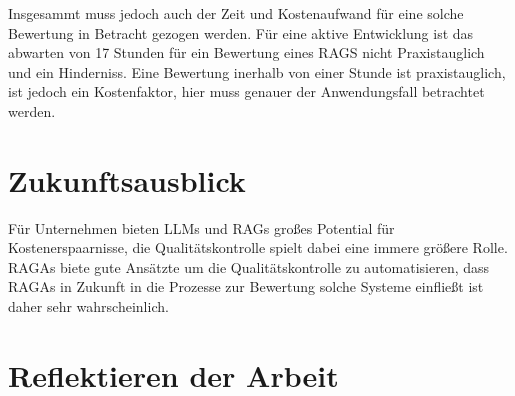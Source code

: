Insgesammt muss jedoch auch der Zeit und Kostenaufwand für eine solche Bewertung in Betracht gezogen werden.
Für eine aktive Entwicklung ist das abwarten von 17 Stunden für ein Bewertung eines RAGS nicht Praxistauglich und ein Hinderniss.
Eine Bewertung inerhalb von einer Stunde ist praxistauglich, ist jedoch ein Kostenfaktor, hier muss genauer der Anwendungsfall betrachtet werden.


\section{Zukunftsausblick}

Für Unternehmen bieten LLMs und RAGs großes Potential für Kostenerspaarnisse, die Qualitätskontrolle spielt dabei eine immere größere Rolle.
RAGAs biete gute Ansätzte um die Qualitätskontrolle zu automatisieren, dass RAGAs in Zukunft in die Prozesse zur Bewertung solche Systeme einfließt ist daher sehr wahrscheinlich.




\section{Reflektieren der Arbeit}